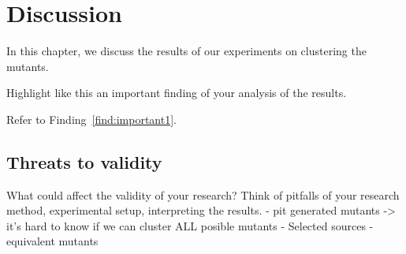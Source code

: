 \documentclass[../main]{subfiles}
\begin{document}
\chapter{Discussion}
\label{ch:discussion}
In this chapter, we discuss the results of our experiments on clustering the mutants.

\begin{finding}
	Highlight like this an important finding of your analysis of the results.
	\label{find:important1}
\end{finding}

Refer to Finding~\ref{find:important1}.

\section{Threats to validity}
What could affect the validity of your research? Think of pitfalls of your research method, experimental setup, interpreting the results.
- pit generated mutants -> it's hard to know if we can cluster ALL posible mutants
- Selected sources
- equivalent mutants
\end{document}

